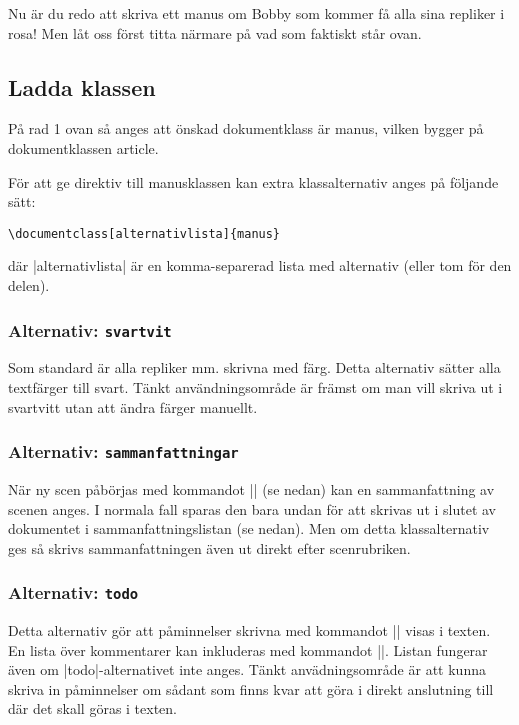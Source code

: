 \documentclass[a4paper,12pt]{article}
\newcommand*{\pack}{\textsf}
\begin{document}
\noindent
Nu är du redo att skriva ett manus om Bobby som kommer få alla sina repliker i rosa! Men låt oss först titta närmare på vad som faktiskt står ovan.

\subsection{Ladda klassen}
På rad 1 ovan så anges att önskad dokumentklass är \pack{manus}, vilken bygger på dokumentklassen \pack{article}.

För att ge direktiv till manusklassen kan extra klassalternativ anges på följande sätt:

\begin{lstlisting}
\documentclass[alternativlista]{manus}
\end{lstlisting}

\noindent
där |alternativlista| är en komma-separerad lista med alternativ (eller tom för den delen).

\subsubsection{Alternativ: \texttt{svartvit}}
\label{alt:svartvit}
Som standard är alla repliker mm. skrivna med färg. Detta alternativ sätter alla textfärger till svart. Tänkt användningsområde är främst om man vill skriva ut i svartvitt utan att ändra färger manuellt. 

\subsubsection{Alternativ: \texttt{sammanfattningar}}
\label{alt:sammanfattningar}
När ny scen påbörjas med kommandot |\scen| (se nedan) kan en sammanfattning av scenen anges. I normala fall sparas den bara undan för att skrivas ut i slutet av dokumentet i sammanfattningslistan (se nedan). Men om detta klassalternativ ges så skrivs sammanfattningen även ut direkt efter scenrubriken.



\subsubsection{Alternativ: \texttt{todo}}
\label{alt:todo}
Detta alternativ gör att påminnelser skrivna med kommandot || visas i texten. En lista över kommentarer kan inkluderas med kommandot |\todolista|. Listan fungerar även om |todo|-alternativet inte anges. Tänkt anvädningsområde är att kunna skriva in påminnelser om sådant som finns kvar att göra i direkt anslutning till där det skall göras i texten.
\end{document}

